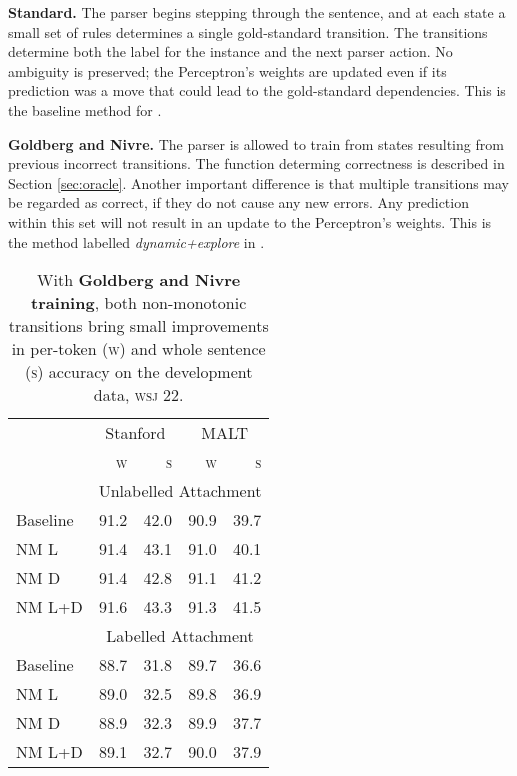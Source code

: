 \documentclass[11pt,letterpaper]{article}
\newcommand{\wsj}{\textsc{wsj}\xspace}
\begin{document}
\textbf{Standard.} 
The parser begins stepping through the sentence, and at each state a small
set of rules determines a single gold-standard transition. The transitions
determine both the label for the instance and the next parser action. No ambiguity
is preserved; the Perceptron's weights are updated even if its prediction was a move
that could lead to the gold-standard dependencies.
This is the baseline method for \citet{goldberg:12}.

\textbf{Goldberg and Nivre.} The parser is allowed to train from states
resulting from previous incorrect transitions. The function determing correctness
is described in Section \ref{sec:oracle}. Another important difference is that
multiple transitions may be regarded as correct, if they do not cause any new
errors. Any prediction within this set will not result in an update to the
Perceptron's weights. This is the method labelled \emph{dynamic+explore}
in \citet{goldberg:12}.

\begin{table}[t]
    \small
    \centering
    \begin{tabular}{l|rrrr}
        \hline
        & \multicolumn{2}{c}{Stanford} & \multicolumn{2}{c}{MALT}  \\
        & \textsc{w}  & \textsc{s} & \textsc{w} & \textsc{s} \\
        \hline \hline
        & \multicolumn{4}{c}{Unlabelled Attachment} \\
        \hline
        Baseline & 91.2 & 42.0 & 90.9 & 39.7 \\
        NM L & 91.4 & 43.1 & 91.0 & 40.1 \\
        NM D & 91.4 & 42.8 & 91.1 & 41.2 \\
        NM L+D & 91.6 & 43.3 & 91.3 & 41.5 \\
        \hline
        & \multicolumn{4}{c}{Labelled Attachment} \\
        \hline
        Baseline & 88.7 & 31.8 & 89.7 & 36.6 \\
        NM L & 89.0 & 32.5 & 89.8 & 36.9 \\
        NM D & 88.9 & 32.3 & 89.9 & 37.7 \\
        NM L+D & 89.1 & 32.7 & 90.0 & 37.9 \\
        \hline
    \end{tabular}
    \caption{\small
        With \textbf{Goldberg and Nivre training}, both non-monotonic transitions
        bring small improvements in per-token (\textsc{w}) and whole sentence (\textsc{s})
        accuracy on the development data, \wsj 22.
        \label{tab:goldberg}}
\end{table}
\end{document}

